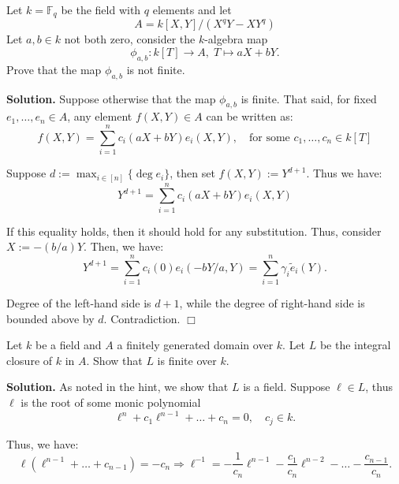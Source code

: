 \documentclass{template}
\newcommand{\qedwhite}{\hfill \ensuremath{\Box}}
\begin{document}
\begin{problem}[Exercise 2]
    Let $k=\mathbb{F}_q$ be the field with $q$ elements and let
    \begin{equation*}
        A = k[X,Y] / (X^qY - XY^q)
    \end{equation*}
    Let $a,b \in k$ not both zero, consider the $k$-algebra map
    \begin{equation*}
        \phi_{a,b}: k[T] \to A, \; T \mapsto aX + bY.
    \end{equation*}
    Prove that the map $\phi_{a,b}$ is not finite.
\end{problem}

\textbf{Solution.} Suppose otherwise that the map $\phi_{a,b}$ is finite. That
said, for fixed $e_1,\dots,e_n \in A$, any element $f(X,Y) \in A$ can be written
as:
\begin{equation*}
    f(X,Y) = \sum_{i=1}^n c_i(aX + bY)e_i(X, Y), \quad \text{for some $c_1,\dots,c_n \in k[T]$}
\end{equation*}

Suppose $d := \max_{i \in [n]}\{\deg e_i\}$, then set $f(X,Y) := Y^{d+1}$. Thus we have:
\begin{equation*}
    Y^{d+1} = \sum_{i=1}^n c_i(aX + bY)e_i(X, Y)
\end{equation*}

If this equality holds, then it should hold for any substitution. Thus, 
consider $X := -(b/a)Y$. Then, we have:
\begin{equation*}
    Y^{d+1} = \sum_{i=1}^n c_i(0)e_i(-bY/a, Y) = \sum_{i=1}^n \gamma_i \widetilde{e}_i(Y).
\end{equation*}

Degree of the left-hand side is $d+1$, while the degree of right-hand side is
bounded above by $d$. Contradiction. \qedwhite

\begin{problem}[Exercise 3]
    Let $k$ be a field and $A$ a finitely generated domain over $k$. Let 
    $L$ be the integral closure of $k$ in $A$. Show that $L$ is finite 
    over $k$. 
\end{problem}

\textbf{Solution.} As noted in the hint, we show that $L$ is a field.
Suppose $\ell \in L$, thus $\ell$ is the root of some monic polynomial
\begin{equation*}
    \ell^n + c_1\ell^{n-1} + \dots + c_n = 0, \quad c_j \in k.
\end{equation*}

Thus, we have:
\begin{equation*}
    \ell(\ell^{n-1}+\dots+c_{n-1}) = -c_n \Rightarrow \ell^{-1} = -\frac{1}{c_n}\ell^{n-1} - \frac{c_1}{c_n}\ell^{n-2} - \dots - \frac{c_{n-1}}{c_n}.
\end{equation*}
\end{document}
